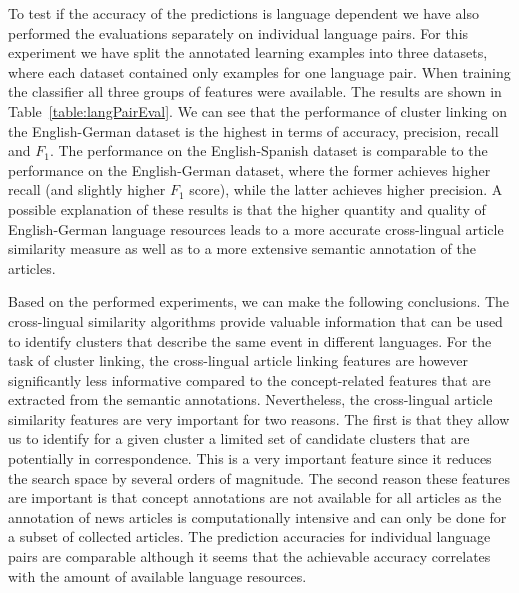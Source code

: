 To test if the accuracy of the predictions is language dependent we have also
performed the evaluations separately on individual language pairs. For this
experiment we have split the annotated learning examples into three datasets,
where each dataset contained only examples for one language pair. When
training the classifier all three groups of features were available. The
results are shown in Table~\ref{table:langPairEval}. We can see that the
performance of cluster linking on the English-German dataset is the highest
in terms of accuracy, precision, recall and $F_1$. The performance on the
English-Spanish dataset is comparable to the performance on the English-German
dataset, where the former achieves higher recall (and slightly higher $F_1$ score),
while the latter achieves higher precision. A possible explanation of these
results is that the higher quantity and quality of English-German language
resources leads to a more accurate cross-lingual article similarity measure
as well as to a more extensive semantic annotation of the articles.

Based on the performed experiments, we can make the following conclusions.
The cross-lingual similarity algorithms provide valuable information that can be
used to identify clusters that describe the same event in different languages.
For the task of cluster linking, the cross-lingual article linking features
are however significantly less informative compared to the concept-related
features that are extracted from the semantic annotations. Nevertheless, the
cross-lingual article similarity features are very important for two reasons.
The first is that they allow us to identify for a given cluster a
limited set of candidate clusters that are potentially in correspondence.
This is a very important feature since it reduces the search space by several
orders of magnitude. The second reason these features are important is
that concept annotations are not available for all articles as the
annotation of news articles is computationally intensive and can only
be done for a subset of collected articles. The prediction accuracies
for individual language pairs are comparable although it seems that
the achievable accuracy correlates with the amount of available language resources.


